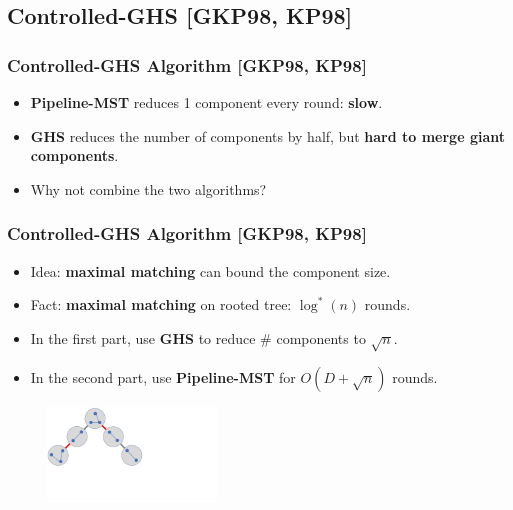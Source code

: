 \subsection{Controlled-GHS [GKP98, KP98]}
\begin{frame}
\frametitle{Controlled-GHS Algorithm [GKP98, KP98]}
\begin{itemize}
    \item \textbf{Pipeline-MST} reduces 1 component every round: \textbf{slow}.
    \item \textbf{GHS} reduces the number of components by half, but \textbf{hard to merge giant components}.
    \item Why not combine the two algorithms?
\end{itemize}
\end{frame}

\begin{frame}
\frametitle{Controlled-GHS Algorithm [GKP98, KP98]}
\begin{itemize}
    \item Idea: \textbf{maximal matching} can bound the component size.
    \item Fact: \textbf{maximal matching} on rooted tree: $\log^*(n)$ rounds.
    \item In the first part, use \textbf{GHS} to reduce \# components to $\sqrt{n}$.
    \item In the second part, use \textbf{Pipeline-MST} for $O(D + \sqrt{n})$ rounds.
\end{itemize}
\begin{figure}
\centering
\includegraphics[width=0.4\textwidth,trim={0cm 5cm 12cm 0},clip]{figures/comptree.pdf}
\end{figure}
\end{frame}

